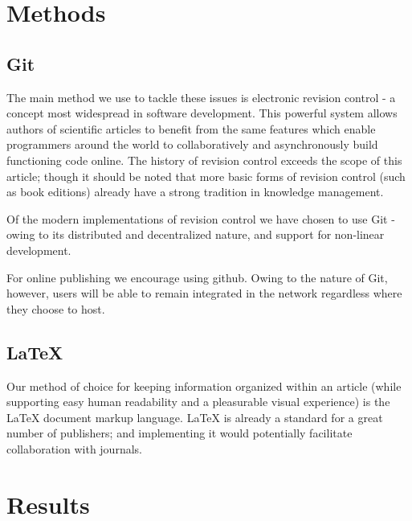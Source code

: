 \section{Methods}
\subsection{Git}
The main method we use to tackle these issues is electronic revision control - a concept most widespread in software development.
This powerful system allows authors of scientific articles to benefit from the same features which enable programmers around the world to collaboratively and asynchronously build functioning code online. 
The history of revision control exceeds the scope of this article; though it should be noted that more basic forms of revision control (such as book editions) already have a strong tradition in knowledge management.

Of the modern implementations of revision control we have chosen to use Git\cite{git} - owing to its distributed and decentralized nature, and support for non-linear development. 

For online publishing we encourage using github\cite{github}. Owing to the nature of Git, however, users will be able to remain integrated in the network regardless where they choose to host.
\subsection{LaTeX}
Our method of choice for keeping information organized within an article (while supporting easy human readability and a pleasurable visual experience) is the LaTeX\cite{latex} document markup language.
LaTeX is already a standard for a great number of publishers;
and implementing it would potentially facilitate collaboration with journals.

\section{Results}
